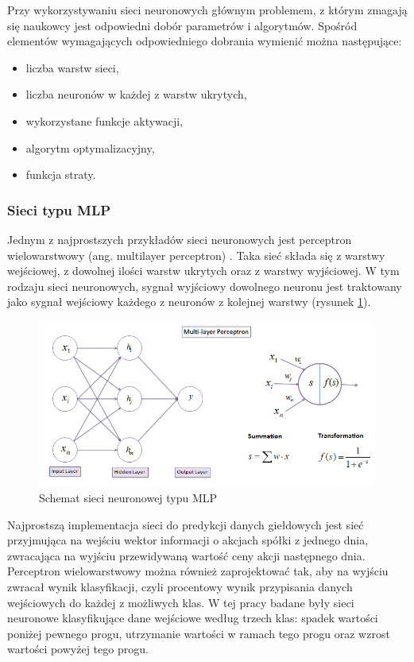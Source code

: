 \documentclass[a4paper, twoside, 11pt, openright]{article}
\begin{document}
\bigskip

Przy wykorzystywaniu sieci neuronowych głównym problemem, z którym zmagają się naukowcy jest odpowiedni dobór parametrów i algorytmów. Spośród elementów wymagających odpowiedniego dobrania wymienić można następujące:
\begin{itemize}
\item liczba warstw sieci,
\item liczba neuronów w każdej z warstw ukrytych,
\item wykorzystane funkcje aktywacji,
\item algorytm optymalizacyjny,
\item funkcja straty.
\end{itemize}


\subsubsection{Sieci typu MLP}

Jednym z najprostszych przykładów sieci neuronowych jest perceptron wielowarstwowy (ang. multilayer perceptron) \cite{mlp}. Taka sieć składa się z warstwy wejściowej, z dowolnej ilości warstw ukrytych oraz z warstwy wyjściowej. W tym rodzaju sieci neuronowych, sygnał wyjściowy dowolnego neuronu jest traktowany jako sygnał wejściowy każdego z neuronów z kolejnej warstwy (rysunek \ref{img:neural-net}). 

\bigskip

\begin{figure}[H]
\centering \includegraphics[scale=0.7]{img/nn.png}
\caption{Schemat sieci neuronowej typu MLP \cite{mlpnn}}
\label{img:neural-net}
\end{figure}

Najprostszą implementacja sieci do predykcji danych giełdowych jest sieć przyjmująca na wejściu wektor informacji o akcjach spółki z jednego dnia, zwracająca na wyjściu przewidywaną wartość ceny akcji następnego dnia. Perceptron wielowarstwowy można również zaprojektować tak, aby na wyjściu zwracał wynik klasyfikacji, czyli procentowy wynik przypisania danych wejściowych do każdej z możliwych klas. W tej pracy badane były sieci neuronowe klasyfikujące dane wejściowe według trzech klas: spadek wartości poniżej pewnego progu, utrzymanie wartości w ramach tego progu oraz wzrost wartości powyżej tego progu. 
\end{document}

